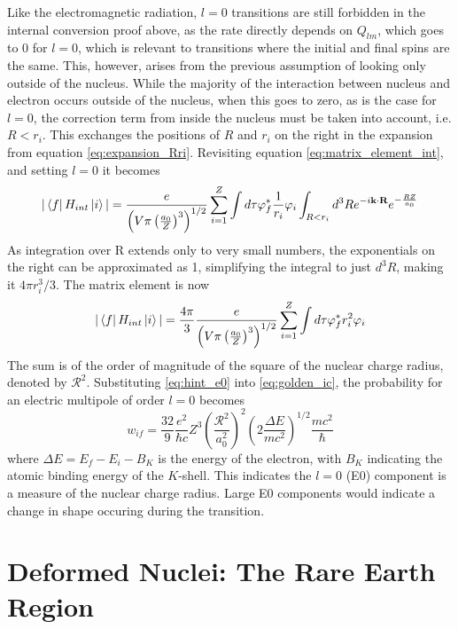 Like the electromagnetic radiation, $l=0$ transitions are still forbidden in the internal conversion proof above, as the rate directly depends on $Q_{lm}$, which goes to 0 for $l=0$, which is relevant to transitions where the initial and final spins are the same. This, however, arises from the previous assumption of looking only outside of the nucleus. While the majority of the interaction between nucleus and electron occurs outside of the nucleus, when this goes to zero, as is the case for $l=0$, the correction term from inside the nucleus must be taken into account, i.e. $R<r_i$. This exchanges the positions of $R$ and $r_i$ on the right in the expansion from equation \ref{eq:expansion_Rri}. Revisiting equation \ref{eq:matrix_element_int}, and setting $l=0$ it becomes
\begin{equation}
\label{eq:matrix_element_E0}
    |\bra{f}H_{int}\ket{i}| = \frac{e}{\left(V\pi\left(\frac{a_0}{Z}\right)^3\right)^{1/2}}\sum_{i=1}^Z \int d\tau\varphi_{f}^*\frac{1}{r_i}\varphi_{i} \int_{R<r_i}d^3R e^{-i\textbf{k}\cdot\textbf{R}} e^{-\frac{RZ}{a_0}}
\end{equation}
As integration over R extends only to very small numbers, the exponentials on the right can be approximated as 1, simplifying the integral to just $d^3R$, making it $4\pi r_i^3/3$. The matrix element is now
\begin{equation}
\label{eq:hint_e0}
    |\bra{f}H_{int}\ket{i}| =  \frac{4\pi}{3}\frac{e}{\left(V\pi\left(\frac{a_0}{Z}\right)^3\right)^{1/2}} \sum_{i=1}^Z \int d\tau\varphi_{f}^*r_i^2\varphi_{i}
\end{equation}
The sum is of the order of magnitude of the square of the nuclear charge radius, denoted by $\mathcal{R}^2$. Substituting \ref{eq:hint_e0} into \ref{eq:golden_ic}, the probability for an electric multipole of order $l=0$ becomes
\begin{equation}
    w_{if} = \frac{32}{9}\frac{e^2}{\hbar c}Z^3\left(\frac{\mathcal{R}^2}{a_0^2}\right)^2\left(2\frac{\Delta E}{mc^2}\right)^{1/2}\frac{mc^2}{\hbar}
\end{equation}
where $\Delta E=E_f-E_i-B_K$ is the energy of the electron, with $B_K$ indicating the atomic binding energy of the $K$-shell. This indicates the $l=0$ (E0) component is a measure of the nuclear charge radius. Large E0 components would indicate a change in shape occuring during the transition. 

\section{Deformed Nuclei: The Rare Earth Region}

